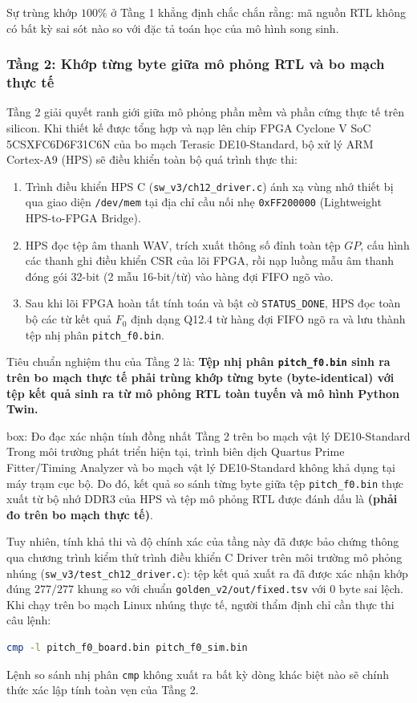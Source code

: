 Sự trùng khớp $100\%$ ở Tầng 1 khẳng định chắc chắn rằng: mã nguồn RTL không có bất kỳ sai sót nào so với đặc tả toán học của mô hình song sinh.

\subsubsection*{Tầng 2: Khớp từng byte giữa mô phỏng RTL và bo mạch thực tế}
Tầng 2 giải quyết ranh giới giữa mô phỏng phần mềm và phần cứng thực tế trên silicon. Khi thiết kế được tổng hợp và nạp lên chip FPGA Cyclone V SoC 5CSXFC6D6F31C6N của bo mạch Terasic DE10-Standard, bộ xử lý ARM Cortex-A9 (HPS) sẽ điều khiển toàn bộ quá trình thực thi:
\begin{enumerate}
    \item Trình điều khiển HPS C (\texttt{sw\_v3/ch12\_driver.c}) ánh xạ vùng nhớ thiết bị qua giao diện \texttt{/dev/mem} tại địa chỉ cầu nối nhẹ \texttt{0xFF200000} (Lightweight HPS-to-FPGA Bridge).
    \item HPS đọc tệp âm thanh WAV, trích xuất thông số đỉnh toàn tệp $GP$, cấu hình các thanh ghi điều khiển CSR của lõi FPGA, rồi nạp luồng mẫu âm thanh đóng gói 32-bit (2 mẫu 16-bit/từ) vào hàng đợi FIFO ngõ vào.
    \item Sau khi lõi FPGA hoàn tất tính toán và bật cờ \texttt{STATUS\_DONE}, HPS đọc toàn bộ các từ kết quả $F_0$ định dạng Q12.4 từ hàng đợi FIFO ngõ ra và lưu thành tệp nhị phân \texttt{pitch\_f0.bin}.
\end{enumerate}

Tiêu chuẩn nghiệm thu của Tầng 2 là: \textbf{Tệp nhị phân \texttt{pitch\_f0.bin} sinh ra trên bo mạch thực tế phải trùng khớp từng byte (byte-identical) với tệp kết quả sinh ra từ mô phỏng RTL toàn tuyến và mô hình Python Twin.}

\begin{todo}{box: Đo đạc xác nhận tính đồng nhất Tầng 2 trên bo mạch vật lý DE10-Standard}
Trong môi trường phát triển hiện tại, trình biên dịch Quartus Prime Fitter/Timing Analyzer và bo mạch vật lý DE10-Standard không khả dụng tại máy trạm cục bộ. Do đó, kết quả so sánh từng byte giữa tệp \texttt{pitch\_f0.bin} thực xuất từ bộ nhớ DDR3 của HPS và tệp mô phỏng RTL được đánh dấu là \textbf{(phải đo trên bo mạch thực tế)}. 

Tuy nhiên, tính khả thi và độ chính xác của tầng này đã được bảo chứng thông qua chương trình kiểm thử trình điều khiển C Driver trên môi trường mô phỏng nhúng (\texttt{sw\_v3/test\_ch12\_driver.c}): tệp kết quả xuất ra đã được xác nhận khớp đúng $277/277\text{ khung}$ so với chuẩn \texttt{golden\_v2/out/fixed.tsv} với $0\text{ byte}$ sai lệch. Khi chạy trên bo mạch Linux nhúng thực tế, người thẩm định chỉ cần thực thi câu lệnh:
\begin{lstlisting}[language=bash]
cmp -l pitch_f0_board.bin pitch_f0_sim.bin
\end{lstlisting}
Lệnh so sánh nhị phân \texttt{cmp} không xuất ra bất kỳ dòng khác biệt nào sẽ chính thức xác lập tính toàn vẹn của Tầng 2.
\end{todo}

